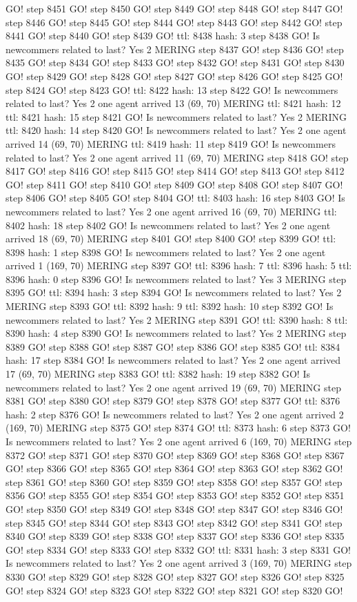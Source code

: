 GO! step 8451 GO! step 8450 GO! step 8449 GO! step 8448 GO! step 8447 GO! step 8446 GO! step 8445 GO! step 8444 GO! step 8443 GO! step 8442 GO! step 8441 GO! step 8440 GO! step 8439 GO! ttl: 8438 hash: 3 step 8438 GO! Is newcommers related to last? Yes 2 MERING step 8437 GO! step 8436 GO! step 8435 GO! step 8434 GO! step 8433 GO! step 8432 GO! step 8431 GO! step 8430 GO! step 8429 GO! step 8428 GO! step 8427 GO! step 8426 GO! step 8425 GO! step 8424 GO! step 8423 GO! ttl: 8422 hash: 13 step 8422 GO! Is newcommers related to last? Yes 2 one agent arrived 13 (69, 70) MERING ttl: 8421 hash: 12 ttl: 8421 hash: 15 step 8421 GO! Is newcommers related to last? Yes 2 MERING ttl: 8420 hash: 14 step 8420 GO! Is newcommers related to last? Yes 2 one agent arrived 14 (69, 70) MERING ttl: 8419 hash: 11 step 8419 GO! Is newcommers related to last? Yes 2 one agent arrived 11 (69, 70) MERING step 8418 GO! step 8417 GO! step 8416 GO! step 8415 GO! step 8414 GO! step 8413 GO! step 8412 GO! step 8411 GO! step 8410 GO! step 8409 GO! step 8408 GO! step 8407 GO! step 8406 GO! step 8405 GO! step 8404 GO! ttl: 8403 hash: 16 step 8403 GO! Is newcommers related to last? Yes 2 one agent arrived 16 (69, 70) MERING ttl: 8402 hash: 18 step 8402 GO! Is newcommers related to last? Yes 2 one agent arrived 18 (69, 70) MERING step 8401 GO! step 8400 GO! step 8399 GO! ttl: 8398 hash: 1 step 8398 GO! Is newcommers related to last? Yes 2 one agent arrived 1 (169, 70) MERING step 8397 GO! ttl: 8396 hash: 7 ttl: 8396 hash: 5 ttl: 8396 hash: 0 step 8396 GO! Is newcommers related to last? Yes 3 MERING step 8395 GO! ttl: 8394 hash: 3 step 8394 GO! Is newcommers related to last? Yes 2 MERING step 8393 GO! ttl: 8392 hash: 9 ttl: 8392 hash: 10 step 8392 GO! Is newcommers related to last? Yes 2 MERING step 8391 GO! ttl: 8390 hash: 8 ttl: 8390 hash: 4 step 8390 GO! Is newcommers related to last? Yes 2 MERING step 8389 GO! step 8388 GO! step 8387 GO! step 8386 GO! step 8385 GO! ttl: 8384 hash: 17 step 8384 GO! Is newcommers related to last? Yes 2 one agent arrived 17 (69, 70) MERING step 8383 GO! ttl: 8382 hash: 19 step 8382 GO! Is newcommers related to last? Yes 2 one agent arrived 19 (69, 70) MERING step 8381 GO! step 8380 GO! step 8379 GO! step 8378 GO! step 8377 GO! ttl: 8376 hash: 2 step 8376 GO! Is newcommers related to last? Yes 2 one agent arrived 2 (169, 70) MERING step 8375 GO! step 8374 GO! ttl: 8373 hash: 6 step 8373 GO! Is newcommers related to last? Yes 2 one agent arrived 6 (169, 70) MERING step 8372 GO! step 8371 GO! step 8370 GO! step 8369 GO! step 8368 GO! step 8367 GO! step 8366 GO! step 8365 GO! step 8364 GO! step 8363 GO! step 8362 GO! step 8361 GO! step 8360 GO! step 8359 GO! step 8358 GO! step 8357 GO! step 8356 GO! step 8355 GO! step 8354 GO! step 8353 GO! step 8352 GO! step 8351 GO! step 8350 GO! step 8349 GO! step 8348 GO! step 8347 GO! step 8346 GO! step 8345 GO! step 8344 GO! step 8343 GO! step 8342 GO! step 8341 GO! step 8340 GO! step 8339 GO! step 8338 GO! step 8337 GO! step 8336 GO! step 8335 GO! step 8334 GO! step 8333 GO! step 8332 GO! ttl: 8331 hash: 3 step 8331 GO! Is newcommers related to last? Yes 2 one agent arrived 3 (169, 70) MERING step 8330 GO! step 8329 GO! step 8328 GO! step 8327 GO! step 8326 GO! step 8325 GO! step 8324 GO! step 8323 GO! step 8322 GO! step 8321 GO! step 8320 GO! 